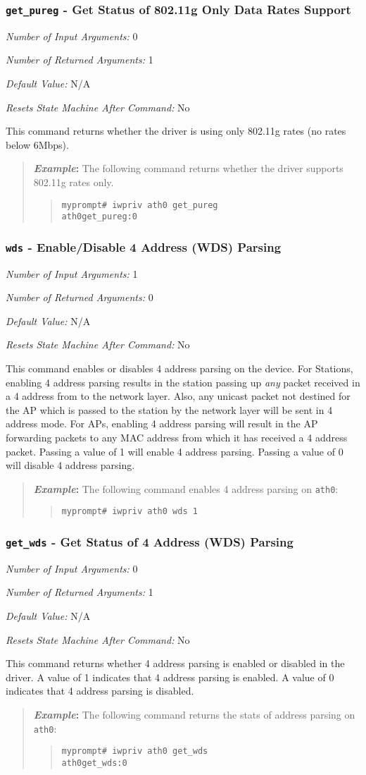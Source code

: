 \documentclass[10pt,fullpage]{article}
\newcommand{\mytt}[1]{{\texttt{#1}}}
\newcommand{\bv}{\begin{verse}}
\newcommand{\ev}{\end{verse}}
\newcommand{\cmd}[1]{{\texttt{myprompt\# #1}}}
\newcommand{\argdesc}[4]{\begin{description}
\itemsep -6pt
\item \textit{Number of Input Arguments:} #1
\item \textit{Number of Returned Arguments:} #2
\item \textit{Default Value:} #3
\item \textit{Resets State Machine After Command:} #4
\end{description}
}
\newenvironment{example}{\begin{quote}\textbf{\textit{Example}:}}{\end{quote}}
\begin{document}
\subsubsection{\mytt{get\_pureg} - Get Status of 802.11g Only Data Rates Support}
\argdesc{0}{1}{N/A}{No}
This command returns whether the driver is using only 802.11g rates
(no rates below 6Mbps).
\begin{example}
The following command returns whether the driver supports 802.11g
rates only.
\bv
\cmd{iwpriv ath0 get\_pureg}\\
\mytt{ath0\hspace{32pt}get\_pureg:0}
\ev
\end{example}

\subsubsection{\mytt{wds} - Enable/Disable 4 Address (WDS) Parsing}
\argdesc{1}{0}{N/A}{No}
This command enables or disables 4 address parsing on the device.  For
Stations, enabling 4 address parsing results in the station passing up
\emph{any} packet received in a 4 address from to the network layer.
Also, any unicast packet not destined for the AP which is passed to
the station by the network layer will be sent in 4 address mode.  For
APs, enabling 4 address parsing will result in the AP forwarding
packets to any MAC address from which it has received a 4 address
packet.  Passing a value of 1 will enable 4 address parsing.  Passing
a value of 0 will disable 4 address parsing.
\begin{example}
The following command enables 4 address parsing on \mytt{ath0}:
\bv
\cmd{iwpriv ath0 wds 1}
\ev
\end{example}

\subsubsection{\mytt{get\_wds} - Get Status of 4 Address (WDS) Parsing}
\argdesc{0}{1}{N/A}{No}
This command returns whether 4 address parsing is enabled or disabled
in the driver.  A value of 1 indicates that 4 address parsing is
enabled. A value of 0 indicates that 4 address parsing is disabled.
\begin{example}
The following command returns the stats of address parsing on \mytt{ath0}:
\bv
\cmd{iwpriv ath0 get\_wds}\\
\mytt{ath0\hspace{32pt}get\_wds:0}
\ev
\end{example}
\end{document}
